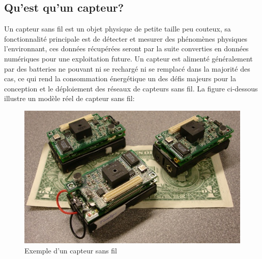 	\subsection{Qu'est qu'un capteur?}
	Un capteur sans fil est un objet physique de petite taille peu couteux, sa fonctionnalité principale est de détecter et mesurer des phénomènes physiques l'environnant, ces données récupérées seront par la suite converties en données numériques pour une exploitation future. Un capteur est alimenté généralement par des batteries ne pouvant ni se rechargé ni se remplacé dans la majorité des cas, ce qui rend la consommation énergétique un des défis majeurs pour la conception et le déploiement des réseaux de capteurs sans fil. La figure ci-dessous illustre un modèle réel de capteur sans fil:
	\begin{figure}[h]
	\begin{center}
	\includegraphics[scale=0.5]{Chapitre1/capteur.jpg}
	\caption{Exemple d'un capteur sans fil}
	\end{center}
	\end{figure}
	
	
	
	
